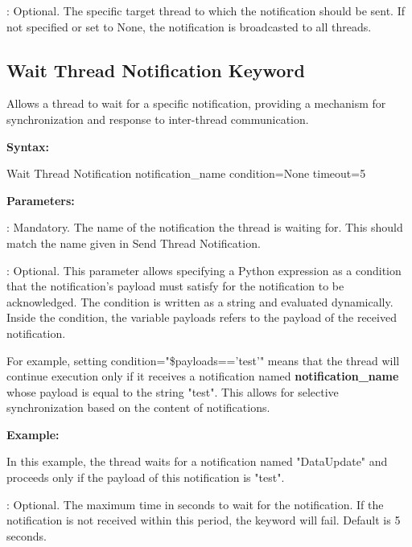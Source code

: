 : Optional. The specific target thread to which the notification should be sent. If not specified or set to None, the notification is broadcasted to all threads.

\subsection{Wait Thread Notification Keyword}

Allows a thread to wait for a specific notification, providing a mechanism for synchronization and response to inter-thread communication.

\textbf{Syntax:}

\begin{robotcode}
Wait Thread Notification     notification_name    condition=None     timeout=5
\end{robotcode}

\textbf{Parameters:}

: Mandatory. The name of the notification the thread is waiting for. This should match the name given in Send Thread Notification.

: Optional. This parameter allows specifying a Python expression as a condition that the notification's payload must satisfy for the notification to be acknowledged. The condition is written as a string and evaluated dynamically. Inside the condition, the variable payloads refers to the payload of the received notification.

For example, setting condition="\$payloads=='test'" means that the thread will continue execution only if it receives a notification named \textbf{notification\_name} whose payload is equal to the string "test". This allows for selective synchronization based on the content of notifications.

\textbf{Example:}

In this example, the thread waits for a notification named "DataUpdate" and proceeds only if the payload of this notification is "test".


: Optional. The maximum time in seconds to wait for the notification. If the notification is not received within this period, the keyword will fail. Default is 5 seconds.

